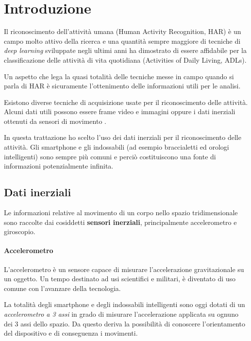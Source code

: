 \chapter{Introduzione}

Il riconoscimento dell'attività umana (Human Activity Recognition, HAR) è un campo molto attivo della ricerca e una
quantità sempre maggiore di tecniche di \textit{deep learning} sviluppate negli ultimi anni ha dimostrato di essere 
affidabile per la classificazione delle attività di vita quotidiana (Activities of Daily Living, ADLs).

Un aspetto che lega la quasi totalità delle tecniche messe in campo quando si parla di HAR è sicuramente l'ottenimento delle informazioni 
utili per le analisi. 

Esistono diverse tecniche di acquisizione usate per il riconoscimento delle attività. 
Alcuni dati utili possono essere frame video e immagini oppure i dati inerziali ottenuti da sensori di movimento \cite{har_survey}.

\vspace{5mm} %

In questa trattazione ho scelto l'uso dei dati inerziali per il riconoscimento delle attività.
Gli smartphone e gli indossabili (ad esempio braccialetti ed orologi intelligenti) sono sempre più comuni e perciò costituiscono 
una fonte di informazioni potenzialmente infinita.


\section{Dati inerziali}
Le informazioni relative al movimento di un corpo nello spazio tridimensionale sono raccolte 
dai cosiddetti \textbf{sensori inerziali}, principalmente accelerometro e giroscopio.
\subsubsection{Accelerometro}
L'accelerometro è un sensore capace di misurare l'accelerazione gravitazionale su un oggetto.
Un tempo destinato ad usi scientifici e militari, è diventato di uso comune con l'avanzare della tecnologia.

La totalità degli smartphone e degli indossabili intelligenti sono oggi dotati di un \textit{accelerometro a 3 assi} in grado 
di misurare l'accelerazione applicata su ognuno dei 3 assi dello spazio. 
Da questo deriva la possibilità di conoscere l'orientamento del dispositivo e di conseguenza i movimenti.

